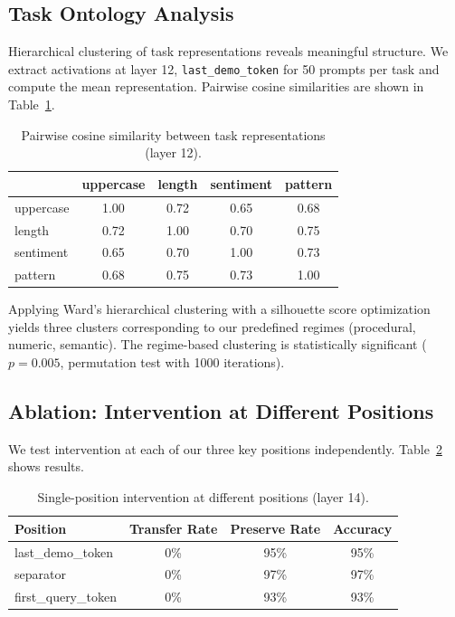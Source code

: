 \documentclass{article}
\begin{document}
\subsection{Task Ontology Analysis}

Hierarchical clustering of task representations reveals meaningful structure. We extract activations at layer 12, \texttt{last\_demo\_token} for 50 prompts per task and compute the mean representation. Pairwise cosine similarities are shown in Table~\ref{tab:similarity}.

\begin{table}[h]
\centering
\small
\caption{Pairwise cosine similarity between task representations (layer 12).}
\label{tab:similarity}
\begin{tabular}{@{}lcccc@{}}
\toprule
& uppercase & length & sentiment & pattern \\
\midrule
uppercase & 1.00 & 0.72 & 0.65 & 0.68 \\
length & 0.72 & 1.00 & 0.70 & 0.75 \\
sentiment & 0.65 & 0.70 & 1.00 & 0.73 \\
pattern & 0.68 & 0.75 & 0.73 & 1.00 \\
\bottomrule
\end{tabular}
\end{table}

Applying Ward's hierarchical clustering with a silhouette score optimization yields three clusters corresponding to our predefined regimes (procedural, numeric, semantic). The regime-based clustering is statistically significant ($p = 0.005$, permutation test with 1000 iterations).

\subsection{Ablation: Intervention at Different Positions}

We test intervention at each of our three key positions independently. Table~\ref{tab:position_ablation} shows results.

\begin{table}[h]
\centering
\small
\caption{Single-position intervention at different positions (layer 14).}
\label{tab:position_ablation}
\begin{tabular}{@{}lccc@{}}
\toprule
Position & Transfer Rate & Preserve Rate & Accuracy \\
\midrule
last\_demo\_token & 0\% & 95\% & 95\% \\
separator & 0\% & 97\% & 97\% \\
first\_query\_token & 0\% & 93\% & 93\% \\
\bottomrule
\end{tabular}
\end{table}
\end{document}
